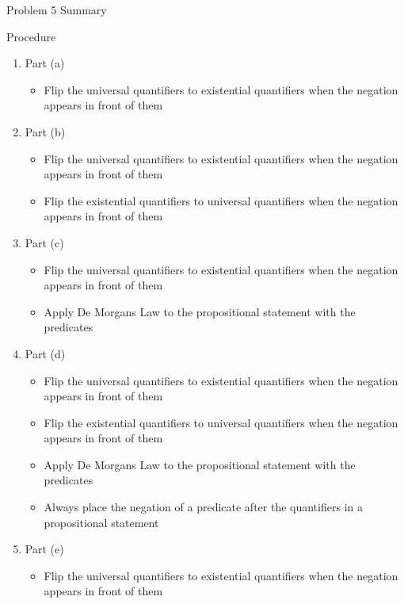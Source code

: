 \begin{summary}{Problem 5 Summary}
    \begin{statement}{Procedure}
        \begin{enumerate}[label = (\alph*)]
            \item Part (a)
            \begin{itemize}
                \item Flip the universal quantifiers to existential quantifiers when the negation appears in front of them
            \end{itemize}
            \item Part (b)
            \begin{itemize}
                \item Flip the universal quantifiers to existential quantifiers when the negation appears in front of them
                \item Flip the existential quantifiers to universal quantifiers when the negation appears in front of them
            \end{itemize}
            \item Part (c)
            \begin{itemize}
                \item Flip the universal quantifiers to existential quantifiers when the negation appears in front of them
                \item Apply De Morgans Law to the propositional statement with the predicates
            \end{itemize}
            \item Part (d)
            \begin{itemize}
                \item Flip the universal quantifiers to existential quantifiers when the negation appears in front of them
                \item Flip the existential quantifiers to universal quantifiers when the negation appears in front of them
                \item Apply De Morgans Law to the propositional statement with the predicates
                \item Always place the negation of a predicate after the quantifiers in a propositional statement
            \end{itemize}
            \item Part (e)
            \begin{itemize}
                \item Flip the universal quantifiers to existential quantifiers when the negation appears in front of them

\end{itemize}
\end{enumerate}
\end{statement}
\end{summary}
